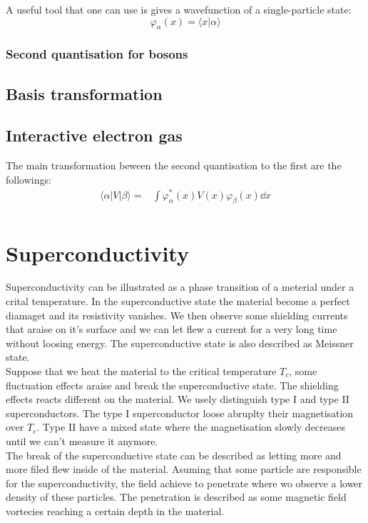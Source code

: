 \documentclass[../main.tex]{subfile}
\begin{document}
A useful tool that one can use is gives a wavefunction of a single-particle state:
\[\varphi_{\alpha}(x) = \langle x|\alpha\rangle\]


\subsubsection{Second quantisation for bosons}
\subsection{Basis transformation}
\subsection{Interactive electron gas}

The main transformation beween the second quantisation to the first are the followings:
\begin{align*}
    \langle \alpha |V|\beta\rangle =& \int  \varphi_{\alpha}^{\ast}(x) V(x) \varphi_{\beta}(x) \dd x\\
\end{align*}

\section{Superconductivity}
Superconductivity can be illustrated as a phase transition of a meterial under a crital temperature. In the superconductive state the material 
become a perfect diamaget and its resistivity vanishes. We then observe some shielding currents that araise on it's surface
and we can let flew a current for a very long time without loosing energy. The superconductive state is also described as Meissner state.\\ 

Suppose that we heat the material to the critical temperature $T_c$, some fluctuation effects araise and break the superconductive state.
The shielding effects reacts different on the material. We usely distinguish type I and type II superconductors. The type I superconductor
loose abruplty their magnetisation over $T_c$. Type II have a mixed state where the magnetisation slowly decreases until we can't measure it anymore.\\

The break of the superconductive state can be described as letting more and more filed 
flew inside of the material. Asuming that some particle are responsible for the superconductivity, the field achieve to penetrate where wo observe 
a lower density of these particles. The penetration is described as some magnetic field vortecies reaching a certain depth in the material.\\
\end{document}
